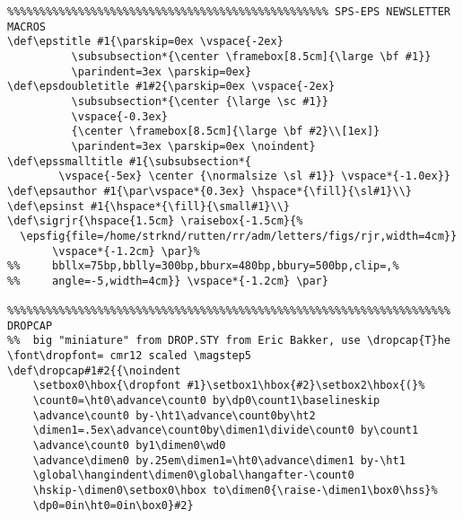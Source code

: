 {\begin{verbatim}
%%%%%%%%%%%%%%%%%%%%%%%%%%%%%%%%%%%%%%%%%%%%%%%%%% SPS-EPS NEWSLETTER MACROS 
\def\epstitle #1{\parskip=0ex \vspace{-2ex}
          \subsubsection*{\center \framebox[8.5cm]{\large \bf #1}}
          \parindent=3ex \parskip=0ex}
\def\epsdoubletitle #1#2{\parskip=0ex \vspace{-2ex}
          \subsubsection*{\center {\large \sc #1}}
          \vspace{-0.3ex}
          {\center \framebox[8.5cm]{\large \bf #2}\\[1ex]}
          \parindent=3ex \parskip=0ex \noindent}
\def\epssmalltitle #1{\subsubsection*{
        \vspace{-5ex} \center {\normalsize \sl #1}} \vspace*{-1.0ex}}
\def\epsauthor #1{\par\vspace*{0.3ex} \hspace*{\fill}{\sl#1}\\}
\def\epsinst #1{\hspace*{\fill}{\small#1}\\}
\def\sigrjr{\hspace{1.5cm} \raisebox{-1.5cm}{%
  \epsfig{file=/home/strknd/rutten/rr/adm/letters/figs/rjr,width=4cm}}
       \vspace*{-1.2cm} \par}%
%%     bbllx=75bp,bblly=300bp,bburx=480bp,bbury=500bp,clip=,%
%%     angle=-5,width=4cm}} \vspace*{-1.2cm} \par}

%%%%%%%%%%%%%%%%%%%%%%%%%%%%%%%%%%%%%%%%%%%%%%%%%%%%%%%%%%%%%%%%%%%%% DROPCAP
%%  big "miniature" from DROP.STY from Eric Bakker, use \dropcap{T}he
\font\dropfont= cmr12 scaled \magstep5
\def\dropcap#1#2{{\noindent
    \setbox0\hbox{\dropfont #1}\setbox1\hbox{#2}\setbox2\hbox{(}%
    \count0=\ht0\advance\count0 by\dp0\count1\baselineskip
    \advance\count0 by-\ht1\advance\count0by\ht2
    \dimen1=.5ex\advance\count0by\dimen1\divide\count0 by\count1
    \advance\count0 by1\dimen0\wd0
    \advance\dimen0 by.25em\dimen1=\ht0\advance\dimen1 by-\ht1
    \global\hangindent\dimen0\global\hangafter-\count0
    \hskip-\dimen0\setbox0\hbox to\dimen0{\raise-\dimen1\box0\hss}%
    \dp0=0in\ht0=0in\box0}#2}


\end{verbatim}}
